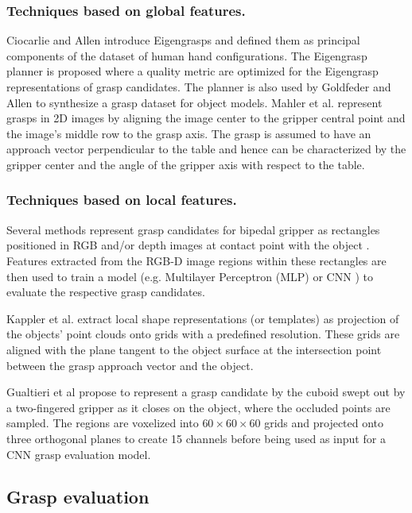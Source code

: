\documentclass[runningheads]{../llncs}
\begin{document}
\subsubsection{Techniques based on global features.}

Ciocarlie and Allen \cite{Ciocarlie2009} introduce Eigengrasps and defined them as principal components of the dataset
of human hand configurations. The Eigengrasp planner is proposed where a quality metric are optimized for the Eigengrasp
representations of grasp candidates. The planner is also used by Goldfeder and Allen \cite{Goldfeder2011} to synthesize
a grasp dataset for object models. Mahler et al. \cite{mahler2017} represent grasps in 2D images by aligning the image
center to the gripper central point and the image's middle row to the grasp axis. The grasp is assumed to have an
approach vector perpendicular to the table and hence can be characterized by the gripper center and the angle of the
gripper axis with respect to the table.

\subsubsection{Techniques based on local features.}

Several methods represent grasp candidates for bipedal gripper as rectangles positioned in RGB and/or depth images at
contact point with the object \cite{jiang2011,Detry2012,lenz2015}. Features extracted from the RGB-D image regions
within these rectangles are then used to train a model (e.g. Multilayer Perceptron (MLP) \cite{lenz2015} or CNN
\cite{jiang2011}) to evaluate the respective grasp candidates.

Kappler et al. \cite{Kappler2015} extract local shape representations (or templates) as projection of the objects'
point clouds onto grids with a predefined resolution. These grids are aligned with the plane tangent to the object
surface at the intersection point between the grasp approach vector and the object.

Gualtieri et al \cite{Gualtieri2016} propose to represent a grasp candidate by the cuboid swept out by a two-fingered
gripper as it closes on the object, where the occluded points are sampled. The regions are voxelized into $60 \times 60
\times 60$ grids and projected onto three orthogonal planes to create 15 channels before being used as input for a CNN
grasp evaluation model.

\subsection{Grasp evaluation} \label{subsec:grasp_evaluation}
\end{document}
